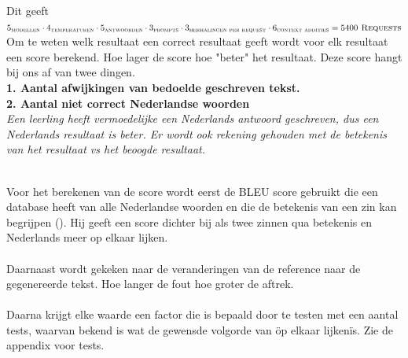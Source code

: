 \documentclass[12pt]{article}
\begin{document}
\vspace{3em}
Dit geeft \large$5_{\textsc{modellen}} \cdot 4_{\textsc{temperaturen}}  \cdot 5_{\textsc{antwoorden}} \cdot 3_{\textsc{prompts}}  \cdot 3_{\textsc{herhalingen per request}}  \cdot 6_{\textsc{context addities}}= 5400 \textsc{ Requests}$ \normalsize
Om te weten welk resultaat een correct resultaat geeft wordt voor elk resultaat een score berekend. Hoe lager de score hoe "beter" het resultaat. Deze score hangt bij ons af van twee dingen. \\
\textbf{1. Aantal afwijkingen van bedoelde geschreven tekst.}\\
\textbf{2. Aantal niet correct Nederlandse woorden}\\
\hspace{3em}\textit{Een leerling heeft vermoedelijke een Nederlands antwoord geschreven, dus een Nederlands resultaat is beter. Er wordt ook rekening gehouden met de betekenis van het resultaat vs het beoogde resultaat.}\\
\\
\begin{minipage}{0.5\linewidth}
Voor het berekenen van de score wordt eerst de BLEU score gebruikt die een database heeft van alle Nederlandse woorden en die de betekenis van een zin kan begrijpen (\cite{academypublicationBLEUtranslation, aclBLEUevaluation, mediumBLEU}). Hij geeft een score dichter bij als twee zinnen qua betekenis en Nederlands meer op elkaar lijken. \\
\\
Daarnaast wordt gekeken naar de veranderingen van de reference naar de gegenereerde tekst. Hoe langer de fout hoe groter de aftrek. \\
\\
Daarna krijgt elke waarde een factor die is bepaald door te testen met een aantal tests, waarvan bekend is wat de gewensde volgorde van \"op elkaar lijken\" is. 
Zie de appendix voor tests.
\end{minipage}%
\hspace{0.4cm}%
\end{document}
